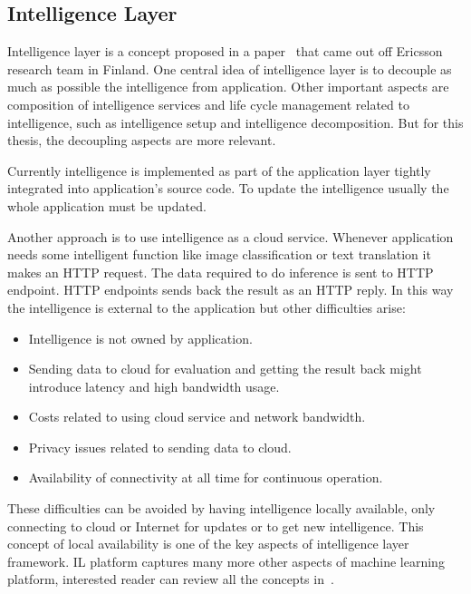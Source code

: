 \documentclass[english, 12pt, a4paper, elec, utf8, online]{aaltothesis}
\begin{document}


\subsection{Intelligence Layer}
Intelligence layer is a concept proposed in a paper~\cite{edgar2019} that came out off Ericsson research team in Finland. One central idea of intelligence layer is to decouple as much as possible the intelligence from application. Other important aspects are composition of intelligence services and life cycle management related to intelligence, such as intelligence setup and intelligence decomposition. But for this thesis, the decoupling aspects are more relevant.

Currently intelligence is implemented as part of the application layer tightly integrated into application's source code. To update the intelligence usually the whole application must be updated. 

Another approach is to use intelligence as a cloud service. Whenever application needs some intelligent function like image classification or text translation it makes an HTTP request. The data required to do inference is sent to HTTP endpoint. HTTP endpoints sends back the result as an HTTP reply. In this way the intelligence is external to the application but other difficulties arise:

\begin{itemize}
\item
Intelligence is not owned by application.
\item
Sending data to cloud for evaluation and getting the result back might introduce latency and high bandwidth usage.
\item
Costs related to using cloud service and network bandwidth.
\item
Privacy issues related to sending data to cloud.
\item 
Availability of connectivity at all time for continuous operation.  
\end{itemize} 

These difficulties can be avoided by having intelligence locally available, only connecting to cloud or Internet for updates or to get new intelligence. This concept of local availability is one of the key aspects of  intelligence layer framework. IL platform captures many more other aspects of machine learning platform, interested reader can review all the concepts in~\cite{edgar2019}.               
\end{document}

